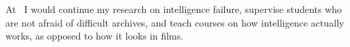 
 At \theshortname\ I would continue my research on intelligence failure, supervise students who are not afraid of difficult archives, and teach courses on how intelligence actually works, as opposed to how it looks in films.
